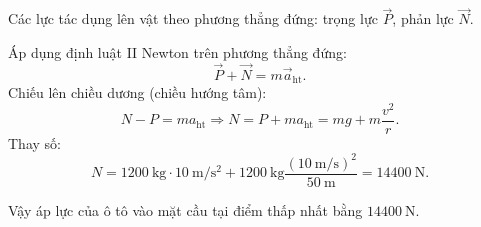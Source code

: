 \begin{enumerate}[label=\bfseries Câu \arabic*:]
{		Các lực tác dụng lên vật theo phương thẳng đứng: trọng lực $\vec P$, phản lực $\vec N$.
		
		Áp dụng định luật II Newton trên phương thẳng đứng:
		$$\vec P + \vec N = m \vec a_\text{ht}.$$
		Chiếu lên chiều dương (chiều hướng tâm):
		$$N-P=ma_\text {ht} \Rightarrow N=P+ma_\text{ht} = mg + m \dfrac{v^2}{r}.$$
		Thay số:
		$$N=\SI{1200}{\kilogram} \cdot \SI{10}{\meter / \second ^2} + \SI{1200}{\kilogram} \dfrac{(\SI{10}{\meter / \second})^2}{\SI{50}{\meter}} = \SI{14400}{\newton}.$$
		
		Vậy áp lực của ô tô vào mặt cầu tại điểm thấp nhất bằng $\SI{14400}{\newton}$.
	}
\end{enumerate}